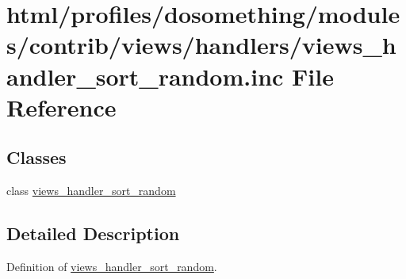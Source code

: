 \hypertarget{views__handler__sort__random_8inc}{
\section{html/profiles/dosomething/modules/contrib/views/handlers/views\_\-handler\_\-sort\_\-random.inc File Reference}
\label{views__handler__sort__random_8inc}
}
\subsection*{Classes}
\begin{DoxyCompactItemize}
\item 
class \hyperlink{classviews__handler__sort__random}{views\_\-handler\_\-sort\_\-random}
\end{DoxyCompactItemize}


\subsection{Detailed Description}
Definition of \hyperlink{classviews__handler__sort__random}{views\_\-handler\_\-sort\_\-random}. 